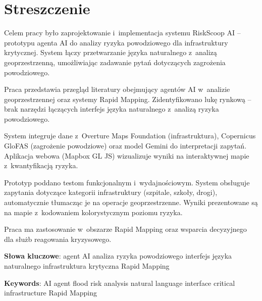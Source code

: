 \section*{Streszczenie}
\label{chap:Streszczenie}

Celem pracy było zaprojektowanie i~implementacja systemu RiskScoop AI -- prototypu agenta AI do analizy ryzyka powodziowego dla infrastruktury krytycznej. System łączy przetwarzanie języka naturalnego z~analizą geoprzestrzenną, umożliwiając zadawanie pytań dotyczących zagrożenia powodziowego.

Praca przedstawia przegląd literatury obejmujący agentów AI w~analizie geoprzestrzennej oraz systemy Rapid Mapping. Zidentyfikowano lukę rynkową -- brak narzędzi łączących interfejs języka naturalnego z~analizą ryzyka powodziowego.

System integruje dane z~Overture Maps Foundation (infrastruktura), Copernicus GloFAS (zagrożenie powodziowe) oraz model Gemini do interpretacji zapytań. Aplikacja webowa (Mapbox GL JS) wizualizuje wyniki na interaktywnej mapie z~kwantyfikacją ryzyka.

Prototyp poddano testom funkcjonalnym i~wydajnościowym. System obsługuje zapytania dotyczące kategorii infrastruktury (szpitale, szkoły, drogi), automatycznie tłumacząc je na operacje geoprzestrzenne. Wyniki prezentowane są na mapie z~kodowaniem kolorystycznym poziomu ryzyka.

Praca ma zastosowanie w~obszarze Rapid Mapping oraz wsparcia decyzyjnego dla służb reagowania kryzysowego.

\bigskip

\textbf{Słowa kluczowe}: \quad agent AI \quad analiza ryzyka powodziowego \quad interfejs języka naturalnego \quad infrastruktura krytyczna \quad Rapid Mapping

\textbf{Keywords}: \quad AI agent \quad flood risk analysis \quad natural language interface \quad critical infrastructure \quad Rapid Mapping
